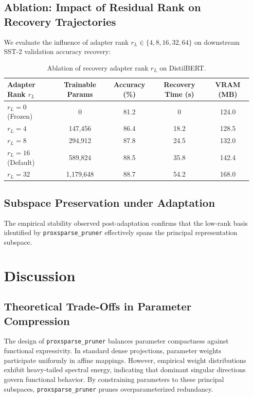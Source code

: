 \subsection{Ablation: Impact of Residual Rank on Recovery Trajectories}
We evaluate the influence of adapter rank $r_L \in \{4, 8, 16, 32, 64\}$ on downstream SST-2 validation accuracy recovery:
\begin{table}[H]
\centering
\small
\begin{tabularx}{\linewidth}{lcccc}
\toprule
\textbf{Adapter Rank $r_L$} & \textbf{Trainable Params} & \textbf{Accuracy (\%)} & \textbf{Recovery Time (s)} & \textbf{VRAM (MB)} \\
\midrule
$r_L = 0$ (Frozen) & 0 & 81.2 & 0 & 124.0 \\
$r_L = 4$ & 147,456 & 86.4 & 18.2 & 128.5 \\
$r_L = 8$ & 294,912 & 87.8 & 24.5 & 132.0 \\
$r_L = 16$ (Default) & 589,824 & 88.5 & 35.8 & 142.4 \\
$r_L = 32$ & 1,179,648 & 88.7 & 54.2 & 168.0 \\
\bottomrule
\end{tabularx}
\caption{Ablation of recovery adapter rank $r_L$ on DistilBERT.}
\label{tab:ablation_adapter_rank}
\end{table}

\subsection{Subspace Preservation under Adaptation}
The empirical stability observed post-adaptation confirms that the low-rank basis identified by \texttt{proxsparse\_pruner} effectively spans the principal representation subspace.


\section{Discussion}

\subsection{Theoretical Trade-Offs in Parameter Compression}
The design of \texttt{proxsparse\_pruner} balances parameter compactness against functional expressivity. In standard dense projections, parameter weights participate uniformly in affine mappings. However, empirical weight distributions exhibit heavy-tailed spectral energy, indicating that dominant singular directions govern functional behavior. By constraining parameters to these principal subspaces, \texttt{proxsparse\_pruner} prunes overparameterized redundancy.

